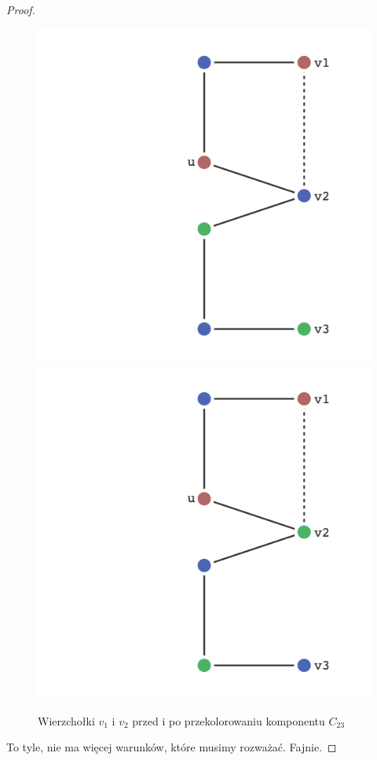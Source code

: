 \begin{proof}
\begin{enumerate}
		      \begin{figure}[H]
			      \centering
			      \includegraphics[scale=0.4]{images/brooks/disconnected_before_swap.png}
			      \includegraphics[scale=0.4]{images/brooks/disconnected_after_swap.png}
			      \caption{Wierzchołki $v_1$ i $v_2$ przed i po przekolorowaniu komponentu $C_{23}$}
		      \end{figure}


	\end{enumerate}

	To tyle, nie ma więcej warunków, które musimy rozważać. Fajnie.

\end{proof}